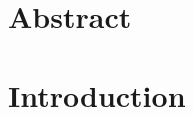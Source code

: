 \documentclass[a4paper,10pt,twoside]{article}
\begin{document}
		\vspace{1cm}
	
	\begin{multicols}{2}
		\tableofcontents
	\end{multicols}
	
		\vspace{1cm}
	
		\section{Abstract}
		
	\twocolumn

	\section{Introduction}\label{sec:intro}
\end{document}
